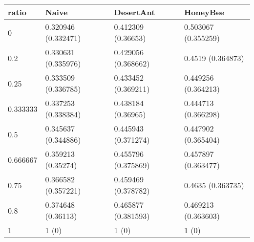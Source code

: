 \begin{tabular} {|l|l|l|l|}
\hline
ratio & Naive & DesertAnt & HoneyBee \\
\hline
0 & 0.320946 (0.332471)  & 0.412309 (0.36653)  & 0.503067 (0.355259)  \\
0.2 & 0.330631 (0.335976)  & 0.429056 (0.368662)  & 0.4519 (0.364873)  \\
0.25 & 0.333509 (0.336785)  & 0.433452 (0.369211)  & 0.449256 (0.364213)  \\
0.333333 & 0.337253 (0.338384)  & 0.438184 (0.36965)  & 0.444713 (0.366298)  \\
0.5 & 0.345637 (0.344886)  & 0.445943 (0.371274)  & 0.447902 (0.365404)  \\
0.666667 & 0.359213 (0.35274)  & 0.455796 (0.375869)  & 0.457897 (0.363477)  \\
0.75 & 0.366582 (0.357221)  & 0.459469 (0.378782)  & 0.4635 (0.363735)  \\
0.8 & 0.374648 (0.36113)  & 0.465877 (0.381593)  & 0.469213 (0.363603)  \\
1 & 1 (0)  & 1 (0)  & 1 (0)  \\
\hline
\end{tabular}
